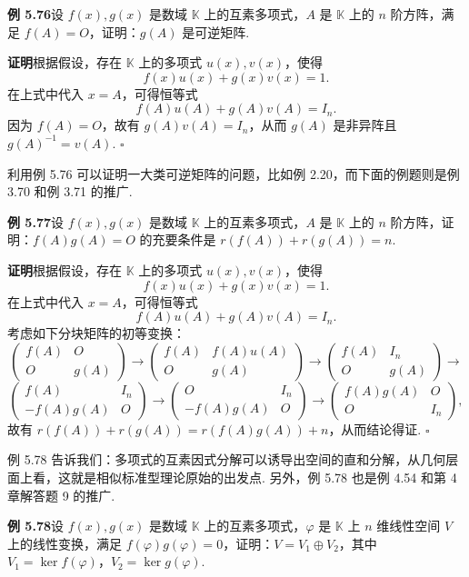 \documentclass[UTF8, 12pt, fontset=fandol, oneside]{ctexart}
\begin{document}
\noindent\textbf{例 5.76}\quad 设 $f(x),g(x)$ 是数域 $\mathbb{K}$ 上的互素多项式，$A$ 是 $\mathbb{K}$ 上的 $n$ 阶方阵，满足 $f(A)=O$，证明：$g(A)$ 是可逆矩阵.

\noindent\textbf{证明}\quad 根据假设，存在 $\mathbb{K}$ 上的多项式 $u(x),v(x)$，使得
\[
f(x)u(x)+g(x)v(x)=1.
\]
在上式中代入 $x=A$，可得恒等式
\[
f(A)u(A)+g(A)v(A)=I_n.
\]
因为 $f(A)=O$，故有 $g(A)v(A)=I_n$，从而 $g(A)$ 是非异阵且 $g(A)^{-1}=v(A)$. \hfill $\square$

利用例 5.76 可以证明一大类可逆矩阵的问题，比如例 2.20，而下面的例题则是例 3.70 和例 3.71 的推广.

\noindent\textbf{例 5.77}\quad 设 $f(x),g(x)$ 是数域 $\mathbb{K}$ 上的互素多项式，$A$ 是 $\mathbb{K}$ 上的 $n$ 阶方阵，证明：$f(A)g(A)=O$ 的充要条件是 $r(f(A))+r(g(A))=n$.

\noindent\textbf{证明}\quad 根据假设，存在 $\mathbb{K}$ 上的多项式 $u(x),v(x)$，使得
\[
f(x)u(x)+g(x)v(x)=1.
\]
在上式中代入 $x=A$，可得恒等式
\[
f(A)u(A)+g(A)v(A)=I_n.
\]
考虑如下分块矩阵的初等变换：
\[
\left(\begin{array}{cc}
f(A) & O\\
O & g(A)
\end{array}\right)
\to
\left(\begin{array}{cc}
f(A) & f(A)u(A)\\
O & g(A)
\end{array}\right)
\to
\left(\begin{array}{cc}
f(A) & I_n\\
O & g(A)
\end{array}\right)
\to
\]
\[
\left(\begin{array}{cc}
f(A) & I_n\\
-f(A)g(A) & O
\end{array}\right)
\to
\left(\begin{array}{cc}
O & I_n\\
-f(A)g(A) & O
\end{array}\right)
\to
\left(\begin{array}{cc}
f(A)g(A) & O\\
O & I_n
\end{array}\right),
\]
故有 $r(f(A))+r(g(A))=r(f(A)g(A))+n$，从而结论得证. \hfill $\square$

例 5.78 告诉我们：多项式的互素因式分解可以诱导出空间的直和分解，从几何层面上看，这就是相似标准型理论原始的出发点. 另外，例 5.78 也是例 4.54 和第 4 章解答题 9 的推广.

\noindent\textbf{例 5.78}\quad 设 $f(x),g(x)$ 是数域 $\mathbb{K}$ 上的互素多项式，$\varphi$ 是 $\mathbb{K}$ 上 $n$ 维线性空间 $V$ 上的线性变换，满足 $f(\varphi)g(\varphi)=0$，证明：$V=V_1\oplus V_2$，其中 $V_1=\ker f(\varphi)$，$V_2=\ker g(\varphi)$.
\end{document}
